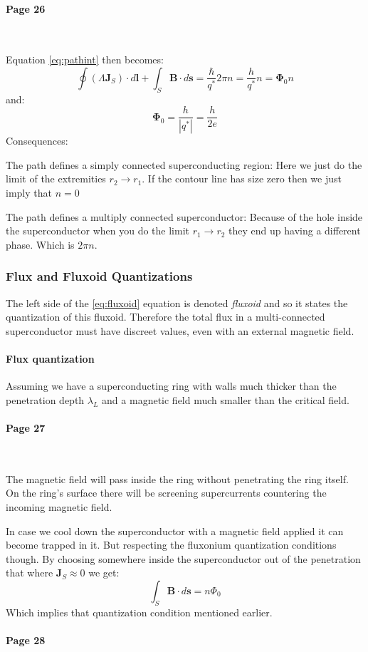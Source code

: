 \documentclass[12pt]{article}
\let\tempthree\enumerate
\let\tempfour\endenumerate
\renewenvironment{enumerate}{\tempthree\setlength{\itemsep}{0pt}}{\tempfour}
\numberwithin{equation}{subsection}
\newcommand\page[1]{
{
\color{blue}\paragraph{
Page #1
}\mbox{}\\
}
}
\begin{document}
\page{26}

Equation \ref{eq:pathint} then becomes:
\begin{equation}
    \oint (\Lambda \mathbf{J}_S) \cdot d\mathbf{l} +\int_S \mathbf{B} \cdot d\mathbf{s} = \frac{\hbar}{q^*} 2\pi n=\frac{h}{q^*} n= \mathbf \Phi _0 n
    \label{eq:fluxoid}
    \end{equation}
and:
\begin{equation}
    \mathbf \Phi _0 = \frac{h}{|q^*|} =  \frac{h}{2e} 
\end{equation}
Consequences:
\begin{enumerate}

    \item The path defines a simply connected superconducting region: Here we just do the limit of the extremities $r_2\rightarrow r_1$. If the contour line has size zero then we just imply that $n=0$
    
    \item The path defines a multiply connected superconductor: Because of the hole inside the superconductor when you do the limit $r_1\rightarrow r_2$ they end up having a different phase. Which is $2\pi n$.
\end{enumerate}

\subsubsection{Flux and Fluxoid Quantizations}
The left side of the \ref{eq:fluxoid} equation is denoted \emph{fluxoid} and so it states the quantization of this fluxoid. 
Therefore the total flux in a multi-connected superconductor must have discreet values, even with an external magnetic field.
\paragraph{Flux quantization\\}
Assuming we have a superconducting ring with walls much thicker than the penetration depth $\lambda_L$ and a magnetic field much smaller than the critical field.
\page {27}
The magnetic field will pass inside the ring without penetrating the ring itself. On the ring's surface there will be screening supercurrents countering the incoming magnetic field. 

In case we cool down the superconductor with a magnetic field applied it can become trapped in it. But respecting the fluxonium quantization conditions though. By choosing somewhere inside the superconductor out of the penetration that where $\mathbf J_S\approx 0$ we get:
\begin{equation}
    \int_S \mathbf B \cdot d\mathbf s = n \Phi_0
\end{equation}
Which implies that quantization condition mentioned earlier.
\page{28}
\end{document}
